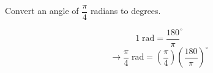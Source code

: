 \question Convert an angle of $\dfrac{\pi}{4}$ radians to degrees.
\begin{solution}
	\[
		1 \; \text{rad} = \frac{180}{\pi}^{\circ}
	\]
	\[
		\rightarrow
		\frac{\pi}{4} \; \text{rad} 
		=
		\left( \frac{\pi}{4} \right) \left( \frac{180}{\pi} \right)^{\circ}
	\]
\end{solution}

